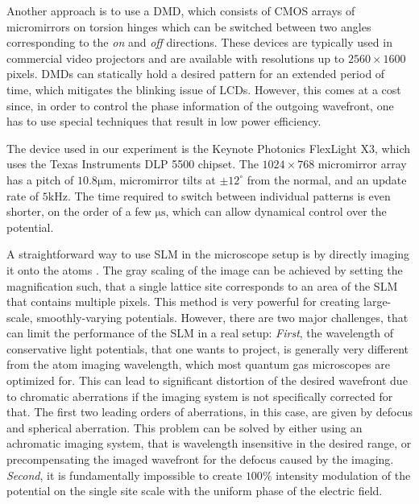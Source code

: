 Another approach is to use a DMD, which consists of CMOS arrays of micromirrors on torsion hinges which can be switched
between two angles corresponding to the \textit{on} and \textit{off} directions. These devices are typically used in commercial video projectors and are available with resolutions up to $2560 \times 1600$ pixels. DMDs can statically hold a desired pattern for an extended period of time, which mitigates the blinking issue of LCDs. However, this comes at a cost since, in order to control the phase information of the outgoing wavefront, one has to use special techniques\cite{Lee1970, Goorden2014} that result in low power efficiency. 

The device used in our experiment is the Keynote Photonics FlexLight X3, which uses the Texas Instruments DLP 5500 chipset. The $1024 \times 768$ micromirror array has a pitch of $10.8 \mathrm{\mu m}$, micromirror tilts at $\pm 12^{\circ}$ from the normal, and an update rate of $5 \mathrm{kHz}$. The time required to switch between individual patterns is even shorter, on the order of a few $\mathrm{\mu s}$, which can allow dynamical control over the potential.

A straightforward way to use SLM in the microscope setup is by directly imaging it onto the atoms \cite{P. Schauß thesis, RMA thesis, MAZU thesis}. The gray scaling of the image can be achieved by setting the magnification such, that a single lattice site corresponds to an area of the SLM that contains multiple pixels. This method is very powerful for creating large-scale, smoothly-varying potentials. However, there are two major challenges, that can limit the performance of the SLM in a real setup: \textit{First}, the wavelength of conservative light potentials, that one wants to project, is generally very different from the atom imaging wavelength, which most quantum gas microscopes are optimized for. This can lead to significant distortion of the desired wavefront due to chromatic aberrations if the imaging system is not specifically corrected for that. The first two leading orders of aberrations, in this case, are given by defocus and spherical aberration. This problem can be solved by either using an achromatic imaging system, that is wavelength insensitive in the desired range, or precompensating the imaged wavefront for the defocus caused by the imaging. \textit{Second}, it is fundamentally impossible to create $100 \%$ intensity modulation of the potential on the single site scale with the uniform phase of the electric field. 

